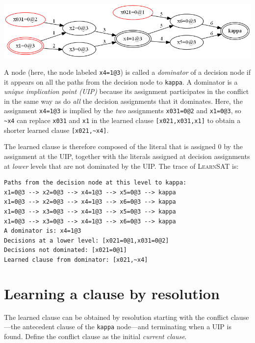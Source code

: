 \documentclass[11pt]{article}
\newcommand*{\p}[1]{\textup{\texttt{#1}}}
\newcommand*{\ls}{\textsc{LearnSAT}}
\begin{document}
\begin{center}
\includegraphics[keepaspectratio=true,width=\textwidth]{dom}
\end{center}

A node (here, the node labeled \p{x4=1@3}) is called a \emph{dominator}
of a decision node if it appears on all the paths from the decision node
to \p{kappa}. A dominator is a \emph{unique implication point (UIP)}
because its assignment participates in the conflict in the same way as
do \emph{all} the decision assignments that it dominates. Here, the
assignment \p{x4=1@3} is implied by the \emph{two} assignments
\p{x031=0@2} and \p{x1=0@3}, so \verb+~x4+ can replace \p{x031} and
\p{x1} in the learned clause \verb+[x021,x031,x1]+ to obtain a shorter
learned clause \verb+[x021,~x4]+.

The learned clause is therefore composed of the literal that is assigned
0 by the assignment at the UIP, together with the literals assigned at
decision assignments at \emph{lower} levels that are not dominated by
the UIP. The trace of \ls{} is:

\begin{verbatim}
Paths from the decision node at this level to kappa:
x1=0@3 --> x2=0@3 --> x4=1@3 --> x5=0@3 --> kappa
x1=0@3 --> x2=0@3 --> x4=1@3 --> x6=0@3 --> kappa
x1=0@3 --> x3=0@3 --> x4=1@3 --> x5=0@3 --> kappa
x1=0@3 --> x3=0@3 --> x4=1@3 --> x6=0@3 --> kappa
A dominator is: x4=1@3
Decisions at a lower level: [x021=0@1,x031=0@2]
Decisions not dominated: [x021=0@1]
Learned clause from dominator: [x021,~x4]
\end{verbatim}

\newpage

\section{Learning a clause by resolution}\label{learned.res}

The learned clause can be obtained by resolution starting with the
conflict clause---the antecedent clause of the \p{kappa} node---and
terminating when a UIP is found. Define the conflict clause as the
initial \emph{current clause}.
\end{document}
